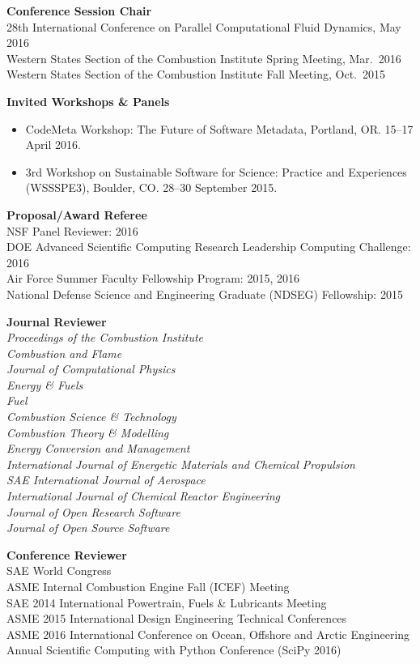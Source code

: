 \documentclass[margin,line,11pt]{res}
\begin{document}
\begin{resume}
\textbf{Conference Session Chair} \\
28th International Conference on Parallel Computational Fluid Dynamics, May 2016 \\
Western States Section of the Combustion Institute Spring Meeting, Mar.\ 2016 \\
Western States Section of the Combustion Institute Fall Meeting, Oct.\ 2015

\textbf{Invited Workshops \& Panels}
\begin{itemize}[leftmargin=*]
\item CodeMeta Workshop: The Future of Software Metadata, Portland, OR. 15--17 April 2016.
\item 3rd Workshop on Sustainable Software for Science: Practice and Experiences (WSSSPE3), Boulder, CO. 28--30 September 2015.
\end{itemize}

\textbf{Proposal\slash Award Referee} \\
NSF Panel Reviewer: 2016 \\
DOE Advanced Scientific Computing Research Leadership Computing Challenge: 2016 \\
Air Force Summer Faculty Fellowship Program: 2015, 2016 \\
National Defense Science and Engineering Graduate (NDSEG) Fellowship: 2015

\textbf{Journal Reviewer} \\
\emph{Proceedings of the Combustion Institute}\\
\emph{Combustion and Flame}\\
\emph{Journal of Computational Physics}\\
\emph{Energy \& Fuels}\\
\emph{Fuel}\\
\emph{Combustion Science \& Technology}\\
\emph{Combustion Theory \& Modelling}\\
\emph{Energy Conversion and Management}\\
\emph{International Journal of Energetic Materials and Chemical Propulsion}\\
\emph{SAE International Journal of Aerospace}\\
\emph{International Journal of Chemical Reactor Engineering} \\
\emph{Journal of Open Research Software} \\
\emph{Journal of Open Source Software}

\textbf{Conference Reviewer} \\
SAE World Congress\\
ASME Internal Combustion Engine Fall (ICEF) Meeting\\
SAE 2014 International Powertrain, Fuels \& Lubricants Meeting \\
ASME 2015 International Design Engineering Technical Conferences \\
ASME 2016  International Conference on Ocean, Offshore and Arctic Engineering \\
 Annual Scientific Computing with Python Conference (SciPy 2016)


\end{resume}
\end{document}
